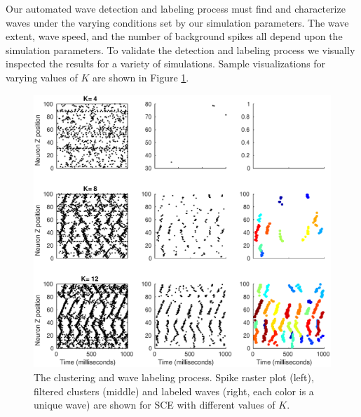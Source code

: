 \documentclass[12pt]{article}
\begin{document}
Our automated wave detection and labeling process must find and characterize waves under the varying conditions set by our simulation parameters.
The wave extent, wave speed, and the number of background spikes all depend upon the simulation parameters.
To validate the detection and labeling process we visually inspected the results for a variety of simulations.
Sample visualizations for varying values of $K$ are shown in Figure \ref{fig:detector_test}.
\begin{figure}[!htb]
 \caption{The clustering and wave labeling process. Spike raster plot (left), filtered clusters (middle) and labeled waves (right, each color is a unique wave) are shown for SCE with different values of $K$. }
 \label{fig:detector_test}
 \centering
   \includegraphics[width=\textwidth]{fig/DetectorTest}
\end{figure}
\FloatBarrier


\clearpage
\end{document}
